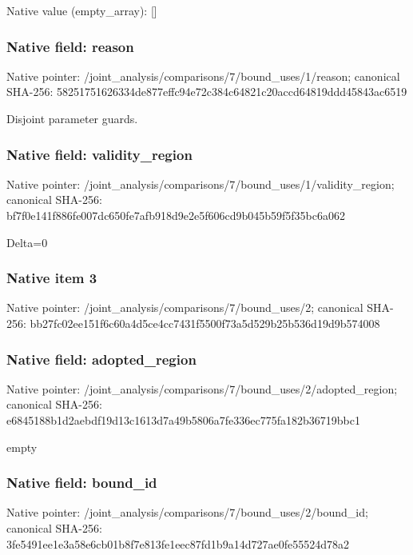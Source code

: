\documentclass[10pt,a4paper]{article}
\begin{document}
Native value (empty\_\allowbreak{}array): []

\subsubsection{Native field: reason}
Native pointer: /joint\_\allowbreak{}analysis/comparisons/7/bound\_\allowbreak{}uses/1/reason; canonical SHA-256: 58251751626334de877effc94e72c384c64821c20accd64819ddd45843ac6519

\begingroup\raggedright\sloppy Disjoint parameter guards.\par\endgroup

\subsubsection{Native field: validity\_\allowbreak{}region}
Native pointer: /joint\_\allowbreak{}analysis/comparisons/7/bound\_\allowbreak{}uses/1/validity\_\allowbreak{}region; canonical SHA-256: bf7f0e141f886fe007dc650fe7afb918d9e2e5f606cd9b045b59f5f35bc6a062

\begingroup\raggedright\sloppy Delta=\allowbreak{}0\par\endgroup

\subsubsection{Native item 3}
Native pointer: /joint\_\allowbreak{}analysis/comparisons/7/bound\_\allowbreak{}uses/2; canonical SHA-256: bb27fc02ee151f6c60a4d5ce4cc7431f5500f73a5d529b25b536d19d9b574008

\subsubsection{Native field: adopted\_\allowbreak{}region}
Native pointer: /joint\_\allowbreak{}analysis/comparisons/7/bound\_\allowbreak{}uses/2/adopted\_\allowbreak{}region; canonical SHA-256: e6845188b1d2aebdf19d13c1613d7a49b5806a7fe336ec775fa182b36719bbc1

\begingroup\raggedright\sloppy empty\par\endgroup

\subsubsection{Native field: bound\_\allowbreak{}id}
Native pointer: /joint\_\allowbreak{}analysis/comparisons/7/bound\_\allowbreak{}uses/2/bound\_\allowbreak{}id; canonical SHA-256: 3fe5491ee1e3a58e6cb01b8f7e813fe1eec87fd1b9a14d727ae0fe55524d78a2
\end{document}
